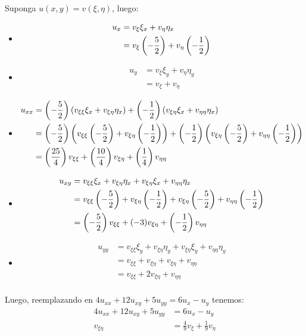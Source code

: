 \begin{homeworkProblem}
\begin{enumerate}[(i)]
\begin{solucion}
\begin{enumerate}
        Suponga $u(x,y)=v(\xi,\eta)$, luego:
        \begin{itemize}
            \item \begin{align*}
                u_{x}&=v_{\xi}\xi_{x}+v_{\eta}\eta_{x}\\
                &=v_{\xi}\left( -\frac{5}{2} \right)+v_{\eta}\left( -\frac{1}{2} \right)
            \end{align*}
            \item \begin{align*}
                u_{y}&=v_{\xi}\xi_{y}+v_{\eta}\eta_{y}\\
                &=v_{\xi}+v_{\eta}
            \end{align*}
            \item \begin{align*}
                u_{xx}&=\left( -\frac{5}{2} \right)(v_{\xi\xi}\xi_{x}+v_{\xi\eta}\eta_{x})+\left( -\frac{1}{2} \right)(v_{\xi\eta}\xi_{x}+v_{\eta\eta}\eta_{x})\\
                &=\left( -\frac{5}{2} \right)\left( v_{\xi\xi}\left( -\frac{5}{2} \right)+v_{\xi\eta}\left( -\frac{1}{2} \right) \right)+\left( -\frac{1}{2} \right)\left( v_{\xi\eta}\left( -\frac{5}{2} \right)+v_{\eta\eta}\left( -\frac{1}{2} \right) \right)\\
                &=\left( \frac{25}{4} \right)v_{\xi\xi}+\left( \frac{10}{4} \right)v_{\xi\eta}+\left( \frac{1}{4} \right)v_{\eta\eta}
            \end{align*}
            \item \begin{align*}
                u_{xy}&=v_{\xi\xi}\xi_{x}+v_{\xi\eta}\eta_{x}+v_{\xi\eta}\xi_{x}+v_{\eta\eta}\eta_{x}\\
                &=v_{\xi\xi}\left( -\frac{5}{2} \right)+v_{\xi\eta}\left( -\frac{1}{2} \right)+v_{\xi\eta}\left( -\frac{5}{2} \right)+v_{\eta\eta}\left( -\frac{1}{2} \right)\\
                &=\left( -\frac{5}{2} \right)v_{\xi\xi}+(-3)v_{\xi\eta}+\left( -\frac{1}{2} \right)v_{\eta\eta}
            \end{align*}
            \item \begin{align*}
                u_{yy}&=v_{\xi\xi}\xi_{y}+v_{\xi\eta}\eta_{y}+v_{\xi\eta}\xi_{y}+v_{\eta\eta}\eta_{y}\\
                &=v_{\xi\xi}+v_{\xi\eta}+v_{\xi\eta}+v_{\eta\eta}\\
                &=v_{\xi\xi}+2v_{\xi\eta}+v_{\eta\eta}\\
            \end{align*}
        \end{itemize}
        Luego, reemplazando en $4u_{xx}+12u_{xy}+5u_{yy}=6u_{x}-u_{y}$ tenemos:
        \begin{align*}
            4u_{xx}+12u_{xy}+5u_{yy}&=6u_{x}-u_{y}\\
            v_{\xi\eta}&=\frac{4}{9}v_{\xi}+\frac{1}{9}v_{\eta}            
        \end{align*}
        

\end{enumerate}
\end{solucion}
\end{enumerate}
\end{homeworkProblem}
